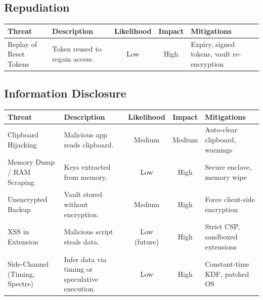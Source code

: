 	\subsection{Repudiation}
		\begin{center}
			\begin{tabularx}{\textwidth}{>{\raggedright\arraybackslash}p{3cm} | X | c | c | X}
				\toprule
				\textbf{Threat} & \textbf{Description} & \textbf{Likelihood} & \textbf{Impact} & \textbf{Mitigations} \\
				\midrule
				Replay of Reset Tokens & Token reused to regain access. & Low & High & Expiry, signed tokens, vault re-encryption \\
				\bottomrule
			\end{tabularx}
		\end{center}
	
	\subsection{Information Disclosure}
		\begin{center}
			\begin{tabularx}{\textwidth}{>{\raggedright\arraybackslash}p{3cm} | X | c | c | X}
				\toprule
				\textbf{Threat} & \textbf{Description} & \textbf{Likelihood} & \textbf{Impact} & \textbf{Mitigations} \\
				\midrule
				Clipboard Hijacking & Malicious app reads clipboard. & Medium & Medium & Auto-clear clipboard, warnings \\
                \midrule
				Memory Dump / RAM Scraping & Keys extracted from memory. & Low & High & Secure enclave, memory wipe \\
                \midrule
				Unencrypted Backup & Vault stored without encryption. & Medium & High & Force client-side encryption \\
                \midrule
				XSS in Extension & Malicious script steals data. & Low (future) & High & Strict CSP, sandboxed extensions \\
                \midrule
				Side-Channel (Timing, Spectre) & Infer data via timing or speculative execution. & Low & High & Constant-time KDF, patched OS \\
				\bottomrule
			\end{tabularx}
		\end{center}
	
